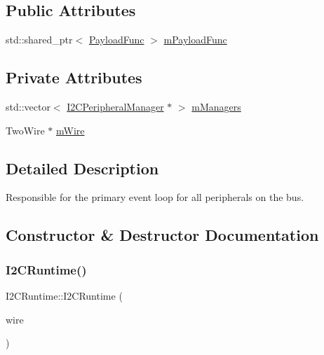 \subsection*{Public Attributes}
\begin{DoxyCompactItemize}
\item 
std\+::shared\+\_\+ptr$<$ \mbox{\hyperlink{_telemetry_protocol_8h_a98c05796bd59110e8ae10dc71580b759}{Payload\+Func}} $>$ \mbox{\hyperlink{class_i2_c_runtime_a2e84a62078fc0169f8abd9e126ed5f38}{m\+Payload\+Func}}
\end{DoxyCompactItemize}
\subsection*{Private Attributes}
\begin{DoxyCompactItemize}
\item 
std\+::vector$<$ \mbox{\hyperlink{class_i2_c_peripheral_manager}{I2\+C\+Peripheral\+Manager}} $\ast$ $>$ \mbox{\hyperlink{class_i2_c_runtime_a399a771421014539f95a53e58debc341}{m\+Managers}}
\item 
Two\+Wire $\ast$ \mbox{\hyperlink{class_i2_c_runtime_a89c15b30195945ec61834ee3f7f8ac88}{m\+Wire}}
\end{DoxyCompactItemize}


\subsection{Detailed Description}
Responsible for the primary event loop for all peripherals on the bus. 

\subsection{Constructor \& Destructor Documentation}
\mbox{\label{class_i2_c_runtime_aa68ca8901478720ad84ec7fb5f7f1494}} 
\subsubsection{\texorpdfstring{I2\+C\+Runtime()}{I2CRuntime()}}
{\footnotesize\ttfamily I2\+C\+Runtime\+::\+I2\+C\+Runtime (\begin{DoxyParamCaption}\item[{Two\+Wire $\ast$}]{wire }\end{DoxyParamCaption})}



